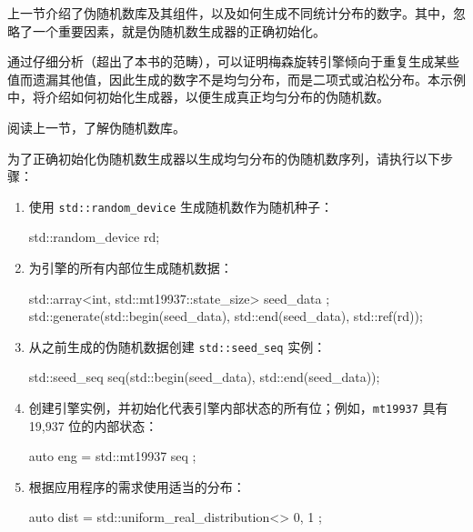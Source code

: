 

上一节介绍了伪随机数库及其组件，以及如何生成不同统计分布的数字。其中，忽略了一个重要因素，就是伪随机数生成器的正确初始化。

通过仔细分析（超出了本书的范畴），可以证明梅森旋转引擎倾向于重复生成某些值而遗漏其他值，因此生成的数字不是均匀分布，而是二项式或泊松分布。本示例中，将介绍如何初始化生成器，以便生成真正均匀分布的伪随机数。


阅读上一节，了解伪随机数库。


为了正确初始化伪随机数生成器以生成均匀分布的伪随机数序列，请执行以下步骤：

\begin{enumerate}
\item
使用 \verb|std::random_device| 生成随机数作为随机种子：

\begin{cpp}
std::random_device rd;
\end{cpp}

\item
为引擎的所有内部位生成随机数据：

\begin{cpp}
std::array<int, std::mt19937::state_size> seed_data {};
std::generate(std::begin(seed_data), std::end(seed_data),
              std::ref(rd));
\end{cpp}

\item
从之前生成的伪随机数据创建 \verb|std::seed_seq| 实例：

\begin{cpp}
std::seed_seq seq(std::begin(seed_data), std::end(seed_data));
\end{cpp}

\item
创建引擎实例，并初始化代表引擎内部状态的所有位；例如，\verb|mt19937| 具有 19,937 位的内部状态：

\begin{cpp}
auto eng = std::mt19937{ seq };
\end{cpp}

\item
根据应用程序的需求使用适当的分布：

\begin{cpp}
auto dist = std::uniform_real_distribution<>{ 0, 1 };
\end{cpp}
\end{enumerate}

